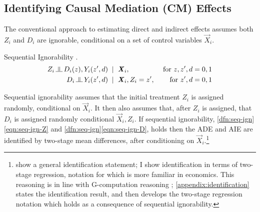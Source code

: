 \subsection{Identifying Causal Mediation (CM) Effects}
The conventional approach to estimating direct and indirect effects assumes both $Z_i$ and $D_i$ are ignorable, conditional on a set of control variables $\vec X_i$.
\begin{definition}
    \label{dfn:seq-ign}
    Sequential Ignorability \citep{imai2010identification}.
    \begin{align}
        \label{eqn:seq-ign-Z}
        Z_i \indep  D_i(z), Y_i(z', d) \;\; &| \;\; \vec X_i,
            &\textnormal{ for } z, z', d = 0, 1 \\
        \label{eqn:seq-ign-D}
        D_i \indep Y_i(z', d) \;\; &| \;\; \vec X_i, Z_i = z', 
            &\textnormal{ for } z', d = 0, 1
    \end{align}
\end{definition}
Sequential ignorability assumes that the initial treatment $Z_i$ is assigned randomly, conditional on $\vec X_i$.
It then also assumes that, after $Z_i$ is assigned, that $D_i$ is assigned randomly conditional $\vec X_i, Z_i$.
If sequential ignorability, \ref{dfn:seq-ign}\eqref{eqn:seq-ign-Z} and \ref{dfn:seq-ign}\eqref{eqn:seq-ign-D}, holds then the ADE and AIE are identified by two-stage mean differences, after conditioning on $\vec X_i$.\footnote{
    \cite{imai2010identification} show a general identification statement; I show identification in terms of two-stage regression, notation for which is more familiar in economics.
    This reasoning is in line with G-computation reasoning \citep{robins1986g};
    \autoref{appendix:identification} states the \cite{imai2010identification} identification result, and then develops the two-stage regression notation which holds as a consequence of sequential ignorability.
}
\vspace{0.1cm}

